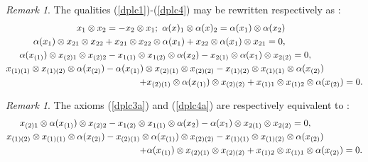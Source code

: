 \documentclass{article}
\theoremstyle{definition}
\theoremstyle{remark}
\newtheorem{rem}[thm]{Remark}
\numberwithin{equation}{section}
\begin{document}
\begin{rem}
 The qualities (\ref{dplc1})-(\ref{dplc4}) may be rewritten respectively as :
\begin{eqnarray}
 x_1\otimes x_2=-x_2\otimes x_1;\ \alpha(x)_1\otimes \alpha(x)_2=\alpha(x_1)\otimes \alpha(x_2)\hspace{3cm}\label{dplc1a}
 \\
\alpha(x_1)\otimes x_{21}\otimes x_{22}+x_{21}\otimes x_{22}\otimes \alpha(x_1)+x_{22}\otimes \alpha(x_1)\otimes x_{21}=0,\hspace{3cm}\label{dplc2a}
\\
\alpha(x_{(1)})\otimes x_{(2)1}\otimes x_{(2)2}-x_{1(1)}\otimes x_{1(2)}\otimes \alpha(x_2)-x_{2(1)}\otimes \alpha(x_1)\otimes x_{2(2)}=0,\hspace{2cm}\label{dplc3a}
\\
x_{(1)(1)}\otimes x_{(1)(2)}\otimes\alpha(x_{(2)})-\alpha(x_{(1)})\otimes x_{(2)(1)}\otimes x_{(2)(2)}
-x_{(1)(2)}\otimes x_{(1)(1)}\otimes\alpha( x_{(2)})\label{dplc4a}\hspace{1,5cm}
\\
+x_{(2)(1)}\otimes \alpha(x_{(1)})\otimes x_{(2)(2)}+x_{(1)1}\otimes x_{(1)2}\otimes \alpha(x_{(2)})=0\nonumber.
\end{eqnarray}
\end{rem}

\begin{rem}
 The axioms (\ref{dplc3a}) and (\ref{dplc4a}) are respectively equivalent to :
\begin{eqnarray}
 x_{(2)1}\otimes \alpha(x_{(1)})\otimes x_{(2)2}- x_{1(2)}\otimes x_{1(1)}\otimes \alpha(x_2)- \alpha(x_1)\otimes x_{2(1)}\otimes x_{2(2)}=0,\hspace{2cm}\label{dplc3b}
 \\
 x_{(1)(2)}\otimes x_{(1)(1)}\otimes \alpha(x_{(2)})- x_{(2)(1)}\otimes \alpha(x_{(1)})\otimes x_{(2)(2)}
- x_{(1)(1)}\otimes x_{(1)(2)}\otimes \alpha(x_{(2)})\label{dplc4b}\hspace{1,5cm}\\
+ \alpha(x_{(1)})\otimes x_{(2)(1)}\otimes x_{(2)(2)}+ x_{(1)2}\otimes x_{(1)1}\otimes \alpha(x_{(2)})=0\nonumber.
\end{eqnarray}
\end{rem}
\end{document}
